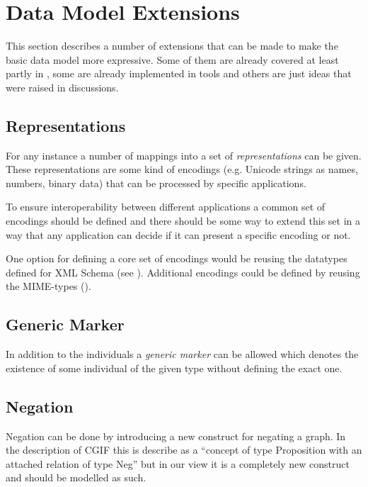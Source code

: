 \documentclass{article}
\newcommand{\defname}{\textit}
\begin{document}
\section{Data Model Extensions}
\label{sec:extensions}

This section describes a number of extensions that can be made to make
the basic data model more expressive. Some of them are already covered
at least partly in \cite{standard}, some are already implemented in
tools and others are just ideas that were raised in discussions.

\subsection{Representations}

For any instance a number of mappings into a set of
\defname{representations} can be given. These representations are some
kind of encodings (e.g. Unicode strings as names, numbers, binary
data) that can be processed by specific applications.

To ensure interoperability between different applications a common set
of encodings should be defined and there should be some way to extend
this set in a way that any application can decide if it can present a
specific encoding or not.

One option for defining a core set of encodings would be reusing the
datatypes defined for XML Schema (see
\cite{XMLS-DT}). Additional encodings could be defined by
reusing the MIME-types (\cite{MIME}).

\subsection{Generic Marker}

In addition to the individuals a \defname{generic marker} can be
allowed which denotes the existence of some individual of the given
type without defining the exact one.

\subsection{Negation}
\label{sec:negation}

Negation can be done by introducing a new construct for negating a
graph. In the description of CGIF this is describe as a ``concept of
type Proposition with an attached relation of type Neg'' but in our
view it is a completely new construct and should be modelled as such.
\end{document}
